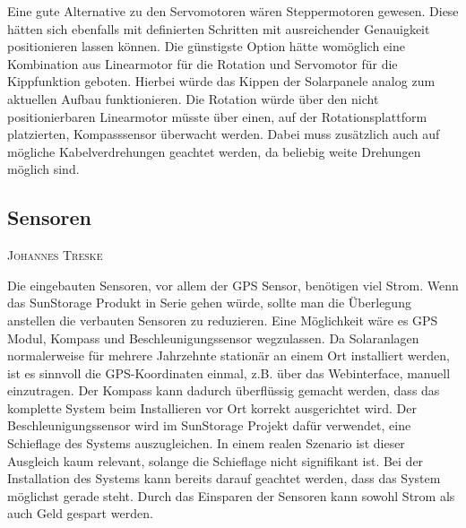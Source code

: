 \documentclass[12pt,a4paper,bibliography=totocnumbered,listof=totocnumbered]{article}
\makeatletter
\newcommand{\chapterauthor}[1]{%
  {\parindent0pt\vspace*{-5pt}%
  \linespread{1.1}\small\scshape#1%
  \par\nobreak\vspace*{3pt}}
  \@afterheading%
}
\makeatother
\begin{document}
Eine gute Alternative zu den Servomotoren wären Steppermotoren gewesen. 
Diese hätten sich ebenfalls mit definierten Schritten mit ausreichender Genauigkeit positionieren lassen können.
Die günstigste Option hätte womöglich eine Kombination aus Linearmotor für die Rotation und Servomotor für die Kippfunktion geboten. 
Hierbei würde das Kippen der Solarpanele analog zum aktuellen Aufbau funktionieren. 
Die Rotation würde über den nicht positionierbaren Linearmotor müsste über einen, auf der Rotationsplattform platzierten, Kompasssensor überwacht werden. 
Dabei muss zusätzlich auch auf mögliche Kabelverdrehungen geachtet werden, da beliebig weite Drehungen möglich sind.
\subsection{Sensoren}
\chapterauthor{Johannes Treske}
Die eingebauten Sensoren, vor allem der GPS Sensor, benötigen viel Strom.
Wenn das SunStorage Produkt in Serie gehen würde, sollte man die Überlegung anstellen die verbauten Sensoren zu reduzieren.
Eine Möglichkeit wäre es GPS Modul, Kompass und Beschleunigungssensor wegzulassen.
Da Solaranlagen normalerweise für mehrere Jahrzehnte stationär an einem Ort installiert werden, ist es sinnvoll die GPS-Koordinaten einmal, z.B. über das Webinterface, manuell einzutragen.
Der Kompass kann dadurch überflüssig gemacht werden, dass das komplette System beim Installieren vor Ort korrekt ausgerichtet wird.
Der Beschleunigungssensor wird im SunStorage Projekt dafür verwendet, eine Schieflage des Systems auszugleichen.
In einem realen Szenario ist dieser Ausgleich kaum relevant, solange die Schieflage nicht signifikant ist.
Bei der Installation des Systems kann bereits darauf geachtet werden, dass das System möglichst gerade steht.
Durch das Einsparen der Sensoren kann sowohl Strom als auch Geld gespart werden.


\end{document}
